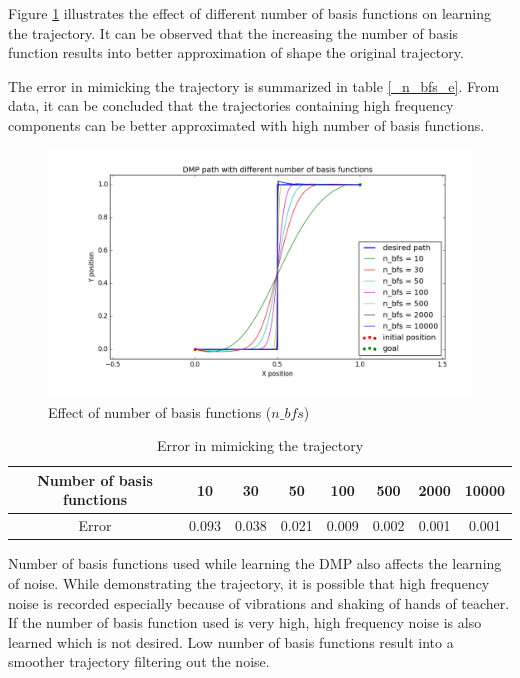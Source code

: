 Figure \ref{fig:n_bfs_} illustrates the effect of different number of basis functions on 
learning the trajectory. It can be observed that the increasing the number of basis function results into better approximation of shape the original trajectory.  

The error in mimicking the trajectory is summarized in table \ref{_n_bfs_e}. From data, it can be concluded that the trajectories containing high frequency components can be better approximated with high number of basis functions.

\begin{figure}[H]
	\includegraphics[width=\textwidth]{images/n_bfs_.png}
	\caption{Effect of number of basis functions ($n\_bfs$)}
	\label{fig:n_bfs_}
\end{figure}

\begin{center}
	\begin{table}[H]
		\begin{tabular}{| c | c | c | c | c | c | c | c |}	
			\hline
			Number of basis functions & 10 & 30 & 50 & 100 & 500 & 2000 & 10000\\       
			\hline
			Error & 0.093 & 0.038 & 0.021 & 0.009 & 0.002 & 0.001 & 0.001\\
			\hline
		\end{tabular}
		\caption{Error in mimicking the trajectory}
	\end{table}\label{_n_bfs_e}
\end{center}



Number of basis functions used while learning the DMP also affects the learning of noise. While demonstrating the trajectory, it is possible that high frequency noise is recorded especially because of vibrations and shaking of hands of teacher. If the number of basis function used is very high, high frequency noise is also learned which is not desired. Low number of basis functions result into a smoother trajectory filtering out the noise. 

